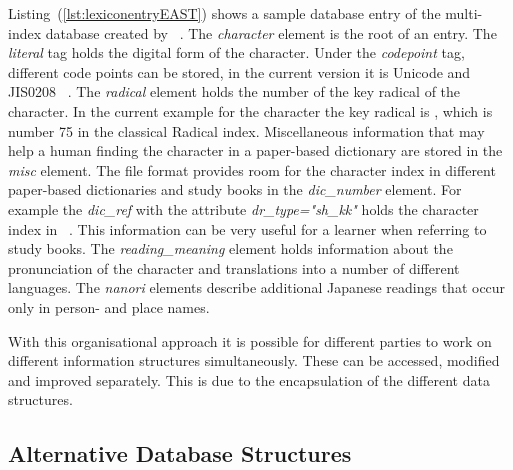Listing~(\ref{lst:lexiconentryEAST}) shows a sample database entry of the 
multi-index database created by~ \citeyear{Breen2004}.
The \emph{character} element is the root of an entry. The \emph{literal} tag 
holds the digital form of the character. Under the \emph{codepoint} tag, 
different code points can be stored, in the current version it is Unicode and 
JIS0208 ~. 
The \emph{radical} element holds the number of the key radical of the character.
In the current example for the character  the key radical is ,
which is number 75 in the classical Radical index.
Miscellaneous information that may help a human finding the character in a 
paper-based dictionary are stored in the \emph{misc} element.
The file format provides room for the character index in different paper-based
dictionaries and study books in the \emph{dic\_number} element. For example 
the \emph{dic\_ref} with the attribute \emph{dr\_type="sh\_kk"} holds the
character index in ~. This information can be very
useful for a learner when referring to study books. The \emph{reading\_meaning}
element holds information about the pronunciation of the character and 
translations into a number of different languages. The \emph{nanori} elements
describe additional Japanese readings that occur only in person- and place names.

With this organisational approach it is possible for different parties to work 
on different information structures simultaneously. These can be accessed,
modified and improved separately. This is due to the encapsulation of the 
different data structures.

\begin{xmlcode}
  id,level,labelSrcRef,labelType,traceRef,from,to},%
                   emphstyle={[2]\color{red}},
                   caption={Sample lexicon entry for lexical data},
                   label=lst:lexiconentryEAST]
                   {chapters/codeSamples/EAST.xml}
\end{xmlcode}

\subsection{Alternative Database Structures}
\label{sec:hwre:alternativedatabasestructures}

